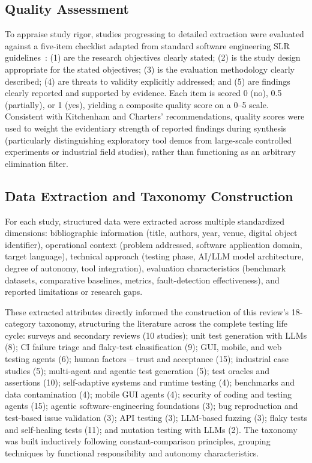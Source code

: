 \subsection{Quality Assessment}
\label{subsec:quality-assessment}
To appraise study rigor, studies progressing to detailed extraction were evaluated
against a five-item checklist adapted from standard software engineering SLR
guidelines~\cite{kitchenham2007}:
(1) are the research objectives clearly stated;
(2) is the study design appropriate for the stated objectives;
(3) is the evaluation methodology clearly described;
(4) are threats to validity explicitly addressed; and
(5) are findings clearly reported and supported by evidence.
Each item is scored 0 (no), 0.5 (partially), or 1 (yes), yielding a composite
quality score on a 0--5 scale. Consistent with Kitchenham and Charters' recommendations,
quality scores were used to weight the evidentiary strength of reported findings during
synthesis (particularly distinguishing exploratory tool demos from large-scale controlled
experiments or industrial field studies), rather than functioning as an arbitrary elimination filter.

\subsection{Data Extraction and Taxonomy Construction}
\label{subsec:data-extraction}
For each study, structured data were extracted across multiple standardized dimensions:
bibliographic information (title, authors, year, venue, digital object identifier),
operational context (problem addressed, software application domain, target language),
technical approach (testing phase, AI/LLM model architecture, degree of autonomy, tool integration),
evaluation characteristics (benchmark datasets, comparative baselines, metrics, fault-detection effectiveness),
and reported limitations or research gaps.

These extracted attributes directly informed the construction of this review's 18-category
taxonomy, structuring the literature across the complete testing life cycle:
surveys and secondary reviews (10 studies); unit test generation with LLMs (8);
CI failure triage and flaky-test classification (9); GUI, mobile, and web testing agents (6);
human factors -- trust and acceptance (15); industrial case studies (5);
multi-agent and agentic test generation (5); test oracles and assertions (10);
self-adaptive systems and runtime testing (4); benchmarks and data contamination (4);
mobile GUI agents (4); security of coding and testing agents (15);
agentic software-engineering foundations (3); bug reproduction and test-based issue validation (3);
API testing (3); LLM-based fuzzing (3); flaky tests and self-healing tests (11);
and mutation testing with LLMs (2).
The taxonomy was built inductively following constant-comparison principles,
grouping techniques by functional responsibility and autonomy characteristics.

